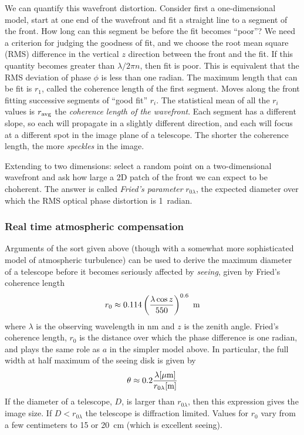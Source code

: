 \documentclass{article}
\begin{document}
We can quantify this wavefront distortion. Consider first a
one-dimensional model, start at one end of the wavefront and fit a
straight line to a segment of the front. How long can this segment be
before the fit becomes ``poor''? We need a criterion for judging the
goodness of fit, and we choose the root mean square (RMS) difference in the
vertical $z$ direction between the front and the fit. If this quantity
becomes greater than $\lambda/2\pi n$, then fit is poor. This is
equivalent that the RMS deviation of phase $\phi$ is less than one
radian. The maximum length that can be fit is $r_1$, called the
coherence length of the first segment. Moves along the front
fitting successive segments of ``good fit'' $r_i$. The statistical
mean of all the $r_i$ values is $r_{\rm avg}$ the {\it coherence
  length of the wavefront}. Each segment has a different slope, so
each will propagate in a slightly different direction, and each will
focus at a different spot in the image plane of a telescope. The
shorter the coherence length, the more {\it speckles} in the image.

Extending to two dimensions: select a random point on a
two-dimensional wavefront and ask how large a 2D patch of the front we
can expect to be choherent. The answer is called {\it Fried's
  parameter} $r_{0\lambda}$, the expected diameter over which the RMS
optical phase distortion is 1~radian.

\subsubsection{Real time atmospheric compensation}

Arguments of the sort given above (though with a somewhat more sophisticated
model of atmospheric turbulence) can be used to derive the maximum diameter
of a telescope before it becomes seriously affected by {\it seeing}, given
by Fried's coherence length 
\[
r_0\approx 0.114\left({\lambda\cos z\over 550}\right)^{0.6}~{\rm m}
\]
where $\lambda$ is the observing wavelength in nm and $z$ is the zenith 
angle. Fried's coherence length, $r_0$ is the distance over which the 
phase difference is one radian, and plays the same role as $a$ in the simpler
model above. In particular, the full width at half maximum of the
seeing disk is given by 
\[
\theta\approx 0.2{\lambda[\mu\mathrm{m}]\over r_{0\lambda}[\mathrm{m}]}
\]
If the diameter of a telescope, $D$, is larger than $r_{0\lambda}$,
then this expression gives the image size. If $D<r_{0\lambda}$ the
telescope is diffraction limited. Values for $r_0$ vary from a few
centimeters to 15 or 20~cm (which is excellent seeing).
\end{document}
